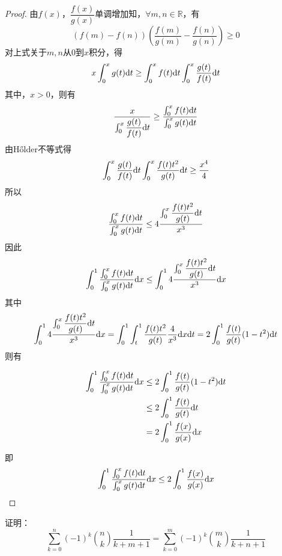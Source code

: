 \begin{proof}
    
    由$f(x)$，$\dfrac{f(x)}{g(x)}$单调增加知，$\forall m, n \in \mathbb{R}$，有
    \[(f(m) - f(n))\left( \dfrac{f(m)}{g(m)} - \dfrac{f(n)}{g(n)} \right) \geq 0\]
    对上式关于$m, n$从$0$到$x$积分，得
    \[x\int_{0}^{x}{g(t)}\mathrm{d} t \geq \int_{0}^{x}{f(t)}\mathrm{d} t \int_{0}^{x}{\dfrac{g(t)}{f(t)}}\mathrm{d} t\]
    其中，$x > 0$，则有
    \[\dfrac{x}{\int_{0}^{x}{\dfrac{g(t)}{f(t)}}\mathrm{d} t} \geq \dfrac{\int_{0}^{x}{f(t)}\mathrm{d} t}{\int_{0}^{x}{g(t)}\mathrm{d} t}\]
    由\textup{H{\H o}lder}不等式得
    \[\int_{0}^{x}{\dfrac{g(t)}{f(t)}}\mathrm{d} t \int_{0}^{x}{\dfrac{f(t)t^2}{g(t)}}\mathrm{d} t \geq \dfrac{x^4}{4}\]
    所以
    \[\dfrac{\int_{0}^{x}{f(t)}\mathrm{d} t}{\int_{0}^{x}{g(t)}\mathrm{d} t} \leq 4 \dfrac{\int_{0}^{x}{\dfrac{f(t)t^2}{g(t)}}\mathrm{d} t}{x^3}\]
    因此
    \[\int_{0}^{1}{\dfrac{\int_{0}^{x}{f(t)}\mathrm{d} t}{\int_{0}^{x}{g(t)}\mathrm{d} t}}\mathrm{d} x \leq \int_{0}^{1}{4 \dfrac{\int_{0}^{x}{\dfrac{f(t)t^2}{g(t)}}\mathrm{d} t}{x^3}}\mathrm{d} x\]
    其中
    \[\int_{0}^{1}{4 \dfrac{\int_{0}^{x}{\dfrac{f(t)t^2}{g(t)}}\mathrm{d} t}{x^3}}\mathrm{d} x = \int_{0}^{1}{\int_{t}^{1}{\dfrac{f(t)t^2}{g(t)}\dfrac{4}{x^3}}\mathrm{d} x}\mathrm{d} t = 2 \int_{0}^{1}{\dfrac{f(t)}{g(t)}(1 - t^2)}\mathrm{d} t\]
    则有
    
    \begin{align*}
        \int_{0}^{1}{\dfrac{\int_{0}^{x}{f(t)}\mathrm{d} t}{\int_{0}^{x}{g(t)}\mathrm{d} t}}\mathrm{d} x & \leq 2 \int_{0}^{1}{\dfrac{f(t)}{g(t)}(1 - t^2)}\mathrm{d} t \\
        & \leq 2 \int_{0}^{1}{\dfrac{f(t)}{g(t)}}\mathrm{d} t \\
        & = 2 \int_{0}^{1}{\dfrac{f(x)}{g(x)}}\mathrm{d} x
    \end{align*}

    即
    \[\int_{0}^{1}{\dfrac{\int_{0}^{x}{f(t)}\mathrm{d} t}{\int_{0}^{x}{g(t)}\mathrm{d} t}}\mathrm{d} x \leq 2\int_{0}^{1}{\dfrac{f(x)}{g(x)}}\mathrm{d} x\]

\end{proof}

\begin{proposition}

    证明：
    \[\sum\limits_{k = 0}^{n}{(-1)^k \binom{n}{k}\dfrac{1}{k + m + 1}} = \sum\limits_{k = 0}^{m}{(-1)^k \binom{m}{k}\dfrac{1}{k + n + 1}}\]

\end{proposition}

